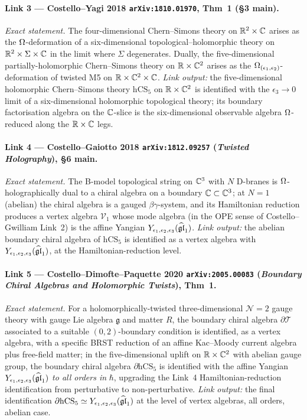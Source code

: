 \paragraph{Link 3 --- Costello--Yagi 2018 \texttt{arXiv:1810.01970},
  Thm~1 (\S3 main).}
\emph{Exact statement.} The four-dimensional Chern--Simons theory on
$\mathbb{R}^2 \times \mathbb{C}$ arises as the $\Omega$-deformation of a
six-dimensional topological--holomorphic theory on
$\mathbb{R}^2 \times \Sigma \times \mathbb{C}$ in the limit where $\Sigma$ degenerates.
Dually, the five-dimensional partially-holomorphic Chern--Simons
theory on $\mathbb{R} \times \mathbb{C}^2$ arises as the $\Omega_{(\epsilon_1,
\epsilon_2)}$-deformation of twisted M5 on
$\mathbb{R} \times \mathbb{C}^2 \times \mathbb{C}$.
\emph{Link output:} the five-dimensional holomorphic Chern--Simons
theory $\mathrm{hCS}_5$ on $\mathbb{R} \times \mathbb{C}^2$ is identified with the
$\epsilon_3 \to 0$ limit of a six-dimensional holomorphic
topological theory; its boundary factorisation algebra on the
$\mathbb{C}$-slice is the six-dimensional observable algebra
$\Omega$-reduced along the $\mathbb{R} \times \mathbb{C}$ legs.

\paragraph{Link 4 --- Costello--Gaiotto 2018 \texttt{arXiv:1812.09257}
  (\emph{Twisted Holography}), \S6 main.}
\emph{Exact statement.} The B-model topological string on $\mathbb{C}^3$ with
$N$ D-branes is $\Omega$-holographically dual to a chiral algebra
on a boundary $\mathbb{C} \subset \mathbb{C}^3$; at $N = 1$ (abelian) the chiral
algebra is a gauged $\beta\gamma$-system, and its Hamiltonian
reduction produces a vertex algebra $\mathcal V_{1}$ whose mode
algebra (in the OPE sense of Costello--Gwilliam Link~2) is the
affine Yangian $Y_{\epsilon_1,\epsilon_2,\epsilon_3}(\widehat{\mathfrak{gl}}_1)$.
\emph{Link output:} the abelian boundary chiral algebra of
$\mathrm{hCS}_5$ is identified as a vertex algebra with
$Y_{\epsilon_1,\epsilon_2,\epsilon_3}(\widehat{\mathfrak{gl}}_1)$, at the Hamiltonian-reduction level.

\paragraph{Link 5 --- Costello--Dimofte--Paquette 2020
  \texttt{arXiv:2005.00083} (\emph{Boundary Chiral Algebras and
  Holomorphic Twists}), Thm~1.}
\emph{Exact statement.} For a holomorphically-twisted
three-dimensional $\mathcal N{=}2$ gauge theory with gauge Lie
algebra $\mathfrak g$ and matter $R$, the boundary chiral algebra
$\partial \mathcal T$ associated to a suitable
$(0, 2)$-boundary condition is identified, as a vertex algebra, with
a specific BRST reduction of an affine Kac--Moody current algebra
plus free-field matter; in the five-dimensional uplift on
$\mathbb{R} \times \mathbb{C}^2$ with abelian gauge group, the boundary chiral
algebra $\partial \mathrm{hCS}_5$ is identified with the
affine Yangian $Y_{\epsilon_1,\epsilon_2,\epsilon_3}(\widehat{\mathfrak{gl}}_1)$ \emph{to all orders in} $\hbar$,
upgrading the Link~4 Hamiltonian-reduction identification from
perturbative to non-perturbative.
\emph{Link output:} the final identification
$\partial \mathrm{hCS}_5 \simeq Y_{\epsilon_1,\epsilon_2,\epsilon_3}(\widehat{\mathfrak{gl}}_1)$ at the level of
vertex algebras, all orders, abelian case.

